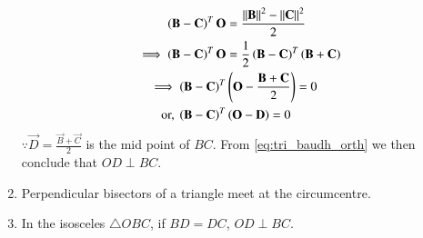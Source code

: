 \begin{enumerate}[label=\arabic*.,ref=\thesubsection.\theenumi]
\begin{align}
\left(\mathbf{B}-\mathbf{C}\right)^T\mathbf{O} &=   \frac{\left\lVert\mathbf{B}\right\rVert^2- \left\lVert\mathbf{C}\right\rVert^2}{2}
\\
\implies \left(\mathbf{B}-\mathbf{C}\right)^T\mathbf{O} &=   \frac{1}{2}\left(\mathbf{B}- \mathbf{C}\right)^T\left(\mathbf{B}+ \mathbf{C}\right)
\\
\implies \left(\mathbf{B}-\mathbf{C}\right)^T&\left(\mathbf{O} - \frac{\mathbf{B}+\mathbf{C}}{2}\right) = 0
\\
\text{or, } \left(\mathbf{B}-\mathbf{C}\right)^T&\left(\mathbf{O} - \mathbf{D}\right) = 0
\end{align}
%
$\because \vec{D} = \frac{\vec{B}+\vec{C}}{2}$ is the mid point of $BC$.  From \eqref{eq:tri_baudh_orth} we then conclude that $OD \perp BC$.
%
\item Perpendicular bisectors of a triangle meet at the circumcentre.
%
\item In the isosceles $\triangle OBC$, if $BD = DC$, $OD \perp BC$.
\label{them:isos_pb}
\end{enumerate}

